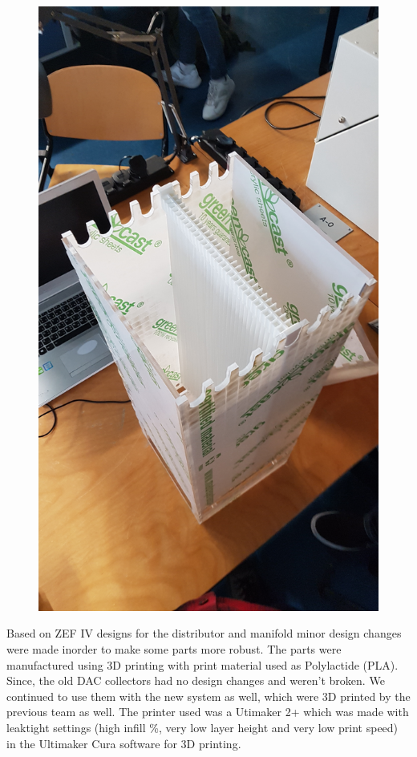 \begin{figure}[H]
\begin{minipage}{.5\textwidth}
  \includegraphics[width=\linewidth, angle = 270]{images/mywork/Sprint1/AssembledPMMA.jpg}
  \label{fig:pmmaass2}
\end{minipage}
\end{figure}

Based on ZEF IV designs for the distributor and manifold minor design changes were made inorder to make some parts more robust. The parts were manufactured using 3D printing with print material used as Polylactide (PLA). Since, the old DAC collectors had no design changes and weren't broken. We continued to use them with the new system as well, which were 3D printed by the previous team as well. The printer used was a Utimaker 2+ which was made with leaktight settings (high infill \%, very low layer height and very low print speed) in the Ultimaker Cura software for 3D printing. 

